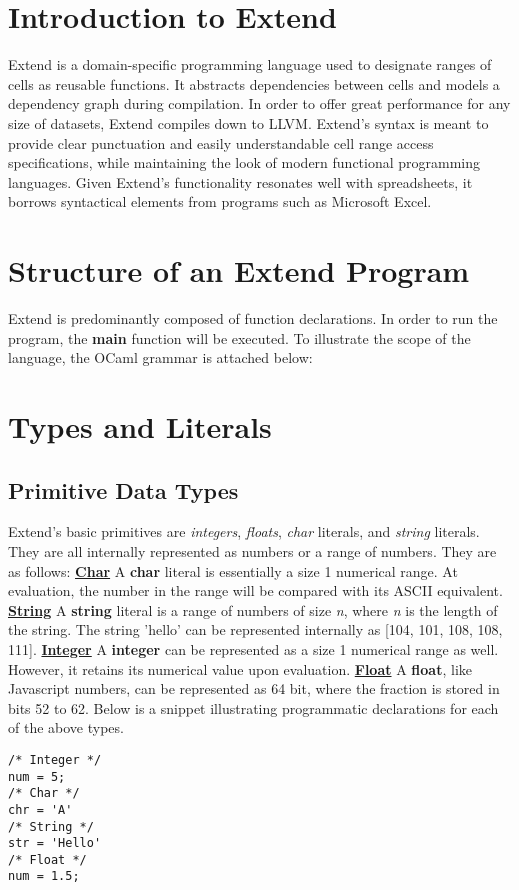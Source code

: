 \section{Introduction to Extend}
	Extend is a domain-specific programming language used to designate ranges of cells as reusable functions. It abstracts dependencies between cells and models a dependency graph during compilation. In order to offer great performance for any size of datasets, Extend compiles down to LLVM.
	\newline
	Extend's syntax is meant to provide clear punctuation and easily understandable cell range access specifications, while maintaining the look of modern functional programming languages. Given Extend's functionality resonates well with spreadsheets, it borrows syntactical elements from programs such as Microsoft Excel.
\section{Structure of an Extend Program}
	Extend is predominantly composed of function declarations. In order to run the program, the \textbf{main} function will be executed. To illustrate the scope of the language, the OCaml grammar is attached below:

\section{Types and Literals}
	\subsection{Primitive Data Types}
		Extend's basic primitives are \textit{integers}, \textit{floats}, \textit{char} literals, and \textit{string} literals. They are all internally represented as numbers or a range of numbers. They are as follows:
		\newline
		\underline{\textbf{Char}}\newline
		A \textbf{char} literal is essentially a size 1 numerical range. At evaluation, the number in the range will be compared with its ASCII equivalent.
  		\newline
		\underline{\textbf{String}}\newline
  		A \textbf{string} literal is a range of numbers of size \textit{n}, where \textit{n} is the length of the string. The string 'hello' can be represented internally as [104, 101, 108, 108, 111].
		\newline
		\underline{\textbf{Integer}}\newline
		A \textbf{integer} can be represented as a size 1 numerical range as well. However, it retains its numerical value upon evaluation. 
		\newline
		\underline{\textbf{Float}}\newline
		A \textbf{float}, like Javascript numbers, can be represented as 64 bit, where the fraction is stored in bits 52 to 62.
		\newline
		Below is a snippet illustrating programmatic declarations for each of the above types.
  		\begin{lstlisting}
/* Integer */
num = 5;
/* Char */
chr = 'A'
/* String */
str = 'Hello'
/* Float */
num = 1.5;
  		\end{lstlisting}
